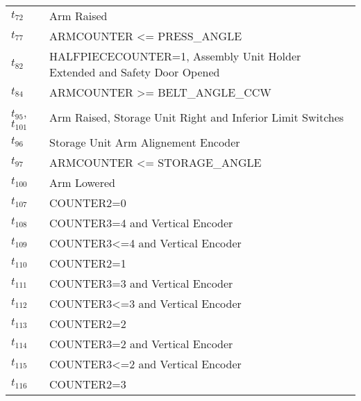 \begin{longtable}{M{5cm}M{10cm}}
\hyperlink{completeNet:t72}{\hypertarget{completeTable:t72}{$t_{72}$}} & Arm Raised\\
\hyperlink{completeNet:t77}{\hypertarget{completeTable:t77}{$t_{77}$}} & ARMCOUNTER <= PRESS\_ANGLE\\
\hyperlink{completeNet:t82}{\hypertarget{completeTable:t82}{$t_{82}$}} & HALFPIECECOUNTER=1, Assembly Unit Holder Extended and Safety Door Opened\\
\hyperlink{completeNet:t84}{\hypertarget{completeTable:t84}{$t_{84}$}} & ARMCOUNTER >= BELT\_ANGLE\_CCW\\
\hyperlink{completeNet:t95}{\hypertarget{completeTable:t95}{$t_{95}$}}, \hyperlink{completeNet:t101}{\hypertarget{completeTable:t101}{$t_{101}$}} & Arm Raised, Storage Unit Right and Inferior Limit Switches\\
\hyperlink{completeNet:t96}{\hypertarget{completeTable:t96}{$t_{96}$}} & Storage Unit Arm Alignement Encoder\\
\hyperlink{completeNet:t97}{\hypertarget{completeTable:t97}{$t_{97}$}} & ARMCOUNTER <= STORAGE\_ANGLE\\
\hyperlink{completeNet:t100}{\hypertarget{completeTable:t100}{$t_{100}$}} & Arm Lowered\\
\hyperlink{completeNet:t107}{\hypertarget{completeTable:t107}{$t_{107}$}} & COUNTER2=0\\
\hyperlink{completeNet:t108}{\hypertarget{completeTable:t108}{$t_{108}$}} & COUNTER3=4 and Vertical Encoder\\
\hyperlink{completeNet:t109}{\hypertarget{completeTable:t109}{$t_{109}$}} & COUNTER3<=4 and Vertical Encoder\\
\hyperlink{completeNet:t110}{\hypertarget{completeTable:t110}{$t_{110}$}} & COUNTER2=1\\
\hyperlink{completeNet:t111}{\hypertarget{completeTable:t111}{$t_{111}$}} & COUNTER3=3 and Vertical Encoder\\
\hyperlink{completeNet:t112}{\hypertarget{completeTable:t112}{$t_{112}$}} & COUNTER3<=3 and Vertical Encoder\\
\hyperlink{completeNet:t113}{\hypertarget{completeTable:t113}{$t_{113}$}} & COUNTER2=2\\
\hyperlink{completeNet:t114}{\hypertarget{completeTable:t114}{$t_{114}$}} & COUNTER3=2 and Vertical Encoder\\
\hyperlink{completeNet:t115}{\hypertarget{completeTable:t115}{$t_{115}$}} & COUNTER3<=2 and Vertical Encoder\\
\hyperlink{completeNet:t116}{\hypertarget{completeTable:t116}{$t_{116}$}} & COUNTER2=3\\

\end{longtable}
